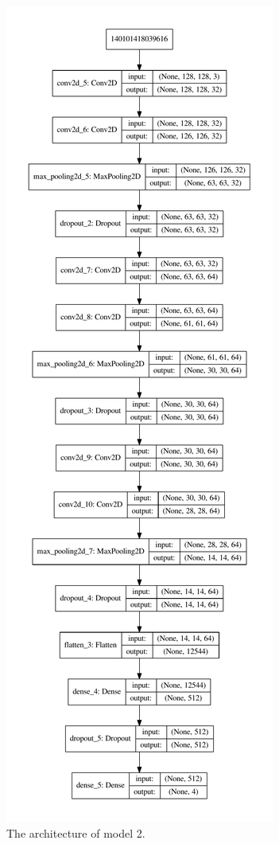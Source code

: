 \documentclass[10pt,a4paper]{article}
\begin{document}
\newpage
\begin{figure}[h]
\centering
\includegraphics[scale=0.43]{model2_plot.pdf}
\caption{The architecture of model 2.}
\label{fig: model2}
\end{figure}
\end{document}
